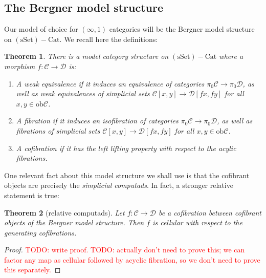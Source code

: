 \documentclass[12pt]{article}
\newtheorem{theorem}{Theorem}[section]
\theoremstyle{definition}
\newcommand{\TODO}[1]{\textcolor{red}{TODO: {#1}}}
\newcommand{\C}{\mathcal{C}}
\newcommand{\D}{\mathcal{D}}
\newcommand{\ssetcat}{(\text{sSet})-\text{Cat}}
\newcommand{\ob}{\text{ob}}
\begin{document}
	\subsection{The Bergner model structure}
		Our model of choice for $(\infty,1)$ categories will be the Bergner model structure on $\ssetcat$. We recall here the definitions: \\
		\begin{theorem}
			There is a model category structure on $\ssetcat$ where a morphism $f: \C \to \D$ is:
			\begin{enumerate}
				\item A weak equivalence if it induces an equivalence of categories $\pi_0 \C \to \pi_0 \D$, as well as weak equivalences of simplicial sets $\C[x,y] \to \D[fx,fy]$ for all $x,y \in \ob \C$.
				\item A fibration if it induces an isofibration of categories $\pi_0 \C \to \pi_0 \D$, as well as fibrations of simplicial sets $\C[x,y] \to \D[fx,fy]$ for all $x,y \in \ob \C$.
				\item A cofibration if it has the left lifting property with respect to the acylic fibrations.
			\end{enumerate}
		\end{theorem}
		One relevant fact about this model structure we shall use is that the cofibrant objects are precisely the \textit{simplicial computads}. In fact, a stronger relative statement is true:
		\begin{theorem}[relative computads]
			Let $f: \C \to \D$ be a cofibration between cofibrant objects of the Bergner model structure. Then $f$ is cellular with respect to the generating cofibrations.
		\end{theorem}		
		\begin{proof}
			\TODO{write proof.}
			\TODO{ actually don't need to prove this; we can factor any map as cellular followed by acyclic fibration, so we don't need to prove this separately.}
		\end{proof}		
\end{document}
